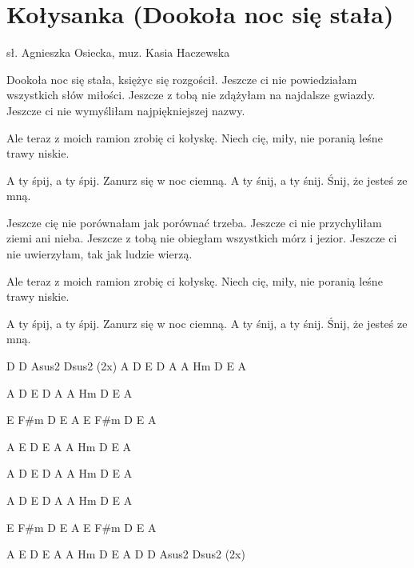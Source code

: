 \section{Kołysanka (Dookoła noc się stała)}{sł. Agnieszka Osiecka, muz. Kasia Haczewska}
\begin{text}

Dookoła noc się stała,
księżyc się rozgościł.
Jeszcze ci nie powiedziałam
wszystkich słów miłości.
Jeszcze z tobą nie zdążyłam
na najdalsze gwiazdy.
Jeszcze ci nie wymyśliłam
najpiękniejszej nazwy.

	Ale teraz z moich ramion
	zrobię ci kołyskę.
	Niech cię, miły, nie poranią
	leśne trawy niskie.

		A ty śpij, a ty śpij.
		Zanurz się w noc ciemną.
		A ty śnij, a ty śnij.
		Śnij, że jesteś ze mną.

Jeszcze cię nie porównałam
jak porównać trzeba.
Jeszcze ci nie przychyliłam
ziemi ani nieba.
Jeszcze z tobą nie obiegłam
wszystkich mórz i jezior.
Jeszcze ci nie uwierzyłam,
tak jak ludzie wierzą.

	Ale teraz z moich ramion
	zrobię ci kołyskę.
	Niech cię, miły, nie poranią
	leśne trawy niskie.

		A ty śpij, a ty śpij.
		Zanurz się w noc ciemną.
		A ty śnij, a ty śnij.
		Śnij, że jesteś ze mną.

\end{text}
\begin{chord}
D D Asus2 Dsus2 (2x)
A D
E D A
A Hm
D E A

A D
E D A
A Hm
D E A

E F#m
D E A
E F#m
D E A

A E
D E A 
A Hm
D E A 

A D
E D A
A Hm
D E A

A D
E D A
A Hm
D E A

E F#m
D E A
E F#m
D E A

A E
D E A 
A Hm
D E A 
D D Asus2 Dsus2 (2x)
\end{chord}